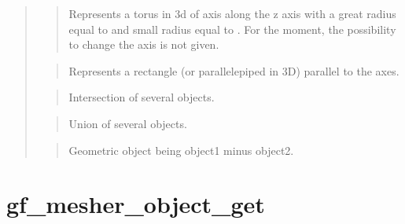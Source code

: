 \documentclass[a4paper,11pt,english]{sphinxmanual}
\begin{document}
\begin{quote}
\begin{quote}
Represents a torus in 3d of axis along the z axis with a great radius
equal to  and small radius equal to . For the moment, the
possibility to change the axis is not given.
\end{quote}

\begin{quote}

Represents a rectangle (or parallelepiped in 3D) parallel to the axes.
\end{quote}

\begin{quote}

Intersection of several objects.
\end{quote}

\begin{quote}

Union of several objects.
\end{quote}

\begin{quote}

Geometric object being object1 minus object2.
\end{quote}
\end{quote}


\section{gf\_mesher\_object\_get}
\label{\detokenize{matlab_octave/cmdref_gf_mesher_object_get:gf-mesher-object-get}}\label{\detokenize{matlab_octave/cmdref_gf_mesher_object_get::doc}}

\begin{sphinxVerbatim}[commandchars=\\\{\}]
    
  
\end{sphinxVerbatim}
\end{document}
